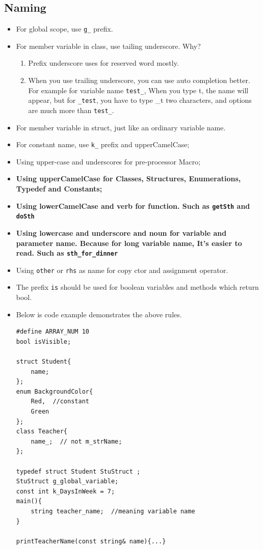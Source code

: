 \documentclass[a4paper,11pt,twoside]{book}
\begin{document}
\subsection{Naming}
\begin{itemize}
	
	\item For global scope, use \texttt{g\_} prefix.
	
	\item For member variable in class, use tailing underscore. Why? 
	\begin{enumerate}
		\item Prefix underscore uses for reserved word mostly.
		\item When you use trailing underscore, you can use auto completion better. For example for variable name \texttt{test\_}, When you type t, the name will appear, but for \texttt{\_test}, you have to type \_t two characters, and options are much more than \texttt{test\_}.
	\end{enumerate}
	
	\item For member variable in struct, just like an ordinary variable name. 
	
	\item For constant name, use \texttt{k\_} prefix and upperCamelCase;
	
	\item Using upper-case and underscores for pre-processor Macro;
	
	\item \textbf{Using upperCamelCase for Classes, Structures, Enumerations, Typedef and  Constants;}
	
	\item \textbf{Using lowerCamelCase and verb for function. Such as \texttt{getSth} and \texttt{doSth}}
	
	\item \textbf{Using lowercase and underscore  and noun for variable and parameter name. Because for long variable name, It's easier to read. Such as \texttt{sth\_for\_dinner}}
	
	\item Using \texttt{other} or \texttt{rhs} as name for copy ctor and assignment operator.
	
	\item The prefix \texttt{is} should be used for boolean variables and methods which return bool.
	
	\item Below is code example demonstrates the above rules. 
\begin{lstlisting}[numbers=none]
#define ARRAY_NUM 10
bool isVisible;

struct Student{
	name;
};
enum BackgroundColor{
	Red,  //constant
	Green
};
class Teacher{
	name_;  // not m_strName;  
};

typedef struct Student StuStruct ;
StuStruct g_global_variable;
const int k_DaysInWeek = 7;
main(){
	string teacher_name;  //meaning variable name
}

printTeacherName(const string& name){...}
\end{lstlisting}
\end{itemize}
\end{document}
